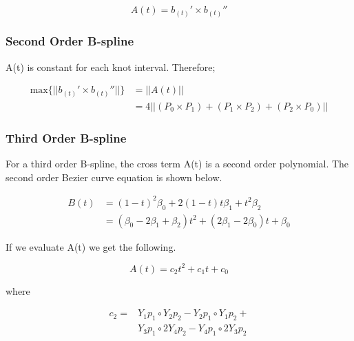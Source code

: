 \documentclass{article}
\begin{document}
\begin{equation}
    A(t)  = b_{(t)}' \times b_{(t)}''
\end{equation}

\subsubsection{Second Order B-spline}

    A(t) is constant for each knot interval. Therefore;

\begin{equation}
\begin{aligned}
    \text{max}\{||b_{(t)}' \times b_{(t)}''||\} &= ||A(t)|| \\
    &=  4\Big|\Big|  (P_0 \times P_1) + (P_1 \times P_2) + (P_2 \times P_0) \Big|\Big|
\end{aligned}
\end{equation}

\subsubsection{Third Order B-spline}

 For a third order B-spline, the cross term A(t) is a second order polynomial. The second order Bezier curve equation is shown below.
 
 \begin{equation} \label{2nd_order_bezier_curve}
 \begin{aligned}
    B(t) &= (1-t)^2 \beta_0 + 2(1-t)t \beta_1 + t^2 \beta_2 \\
    &= (\beta_0 - 2\beta_1 + \beta_2)t^2 + (2\beta_1 - 2\beta_0)t + \beta_0
\end{aligned}
 \end{equation}
 
 If we evaluate A(t) we get the following.
 
 \begin{equation} \label{2nd_order_cross_term}
     A(t) = c_2 t^2  + c_1 t + c_0
 \end{equation}
 
 where
 
 \begin{equation}
 \begin{aligned}
     c_2 = & Y_1p_1\circ Y_2 p_2 - Y_2 p_1\circ Y_1p_2 + \\
     & Y_3p_1\circ 2 Y_4 p_2 - Y_4p_1\circ 2 Y_3 p_2
\end{aligned}
 \end{equation}
 
\end{document}
